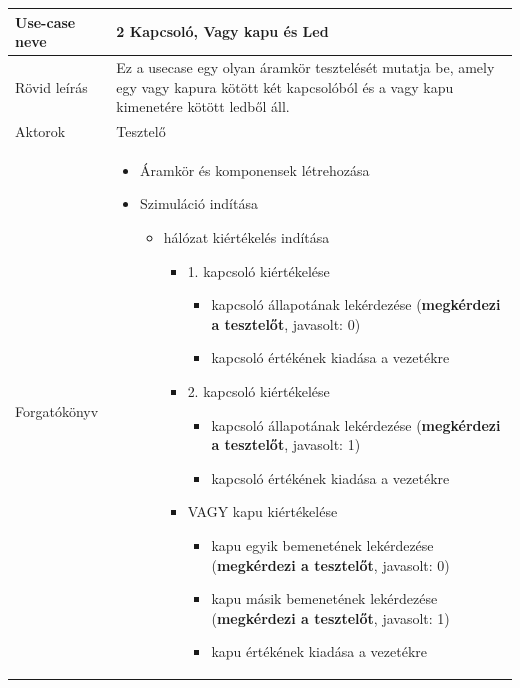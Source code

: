 	\begin{longtable}{| l | p{12cm} |}
	\hline
	\textbf{Use-case neve}   & {2 Kapcsoló, Vagy kapu és Led} \tabularnewline
	\hline\hline
	Rövid leírás    & {Ez a usecase egy olyan áramkör tesztelését mutatja be, amely egy vagy kapura kötött két kapcsolóból és a vagy kapu kimenetére kötött ledből áll.} \tabularnewline
	\hline
	Aktorok         & {Tesztelő} \tabularnewline
	\hline
	Forgatókönyv    &  \vspace{-15pt}
\begin{itemize}
\setlength{\itemsep}{0cm}%
\setlength{\parskip}{0cm}%
\setlength{\itemindent}{-10pt}%
\item Áramkör és komponensek létrehozása
\item Szimuláció indítása
\begin{itemize}
\setlength{\itemsep}{0cm}%
\setlength{\parskip}{0cm}%
\setlength{\itemindent}{-25pt}%
\item hálózat kiértékelés indítása
\begin{itemize}
\setlength{\itemsep}{0cm}%
\setlength{\parskip}{0cm}%
\setlength{\itemindent}{-25pt}%
	\item 1. kapcsoló kiértékelése
	\begin{itemize}
	\setlength{\itemsep}{0cm}%
	\setlength{\parskip}{0cm}%
	\setlength{\itemindent}{-25pt}%
		\item kapcsoló állapotának lekérdezése (\textbf{megkérdezi a tesztelőt}, javasolt: 0)
		\item kapcsoló értékének kiadása a vezetékre
	\end{itemize}
	\item 2. kapcsoló kiértékelése
	\begin{itemize}
	\setlength{\itemsep}{0cm}%
	\setlength{\parskip}{0cm}%
	\setlength{\itemindent}{-25pt}%
		\item kapcsoló állapotának lekérdezése (\textbf{megkérdezi a tesztelőt}, javasolt: 1)
		\item kapcsoló értékének kiadása a vezetékre
	\end{itemize}
	\item VAGY kapu kiértékelése
	\begin{itemize}
	\setlength{\itemsep}{0cm}%
	\setlength{\parskip}{0cm}%
	\setlength{\itemindent}{-25pt}%
		\item kapu egyik bemenetének lekérdezése (\textbf{megkérdezi a tesztelőt}, javasolt: 0)
		\item kapu másik bemenetének lekérdezése (\textbf{megkérdezi a tesztelőt}, javasolt: 1)
		\item kapu értékének kiadása a vezetékre

\end{itemize}
\end{itemize}
\end{itemize}
\end{itemize}
\end{longtable}
